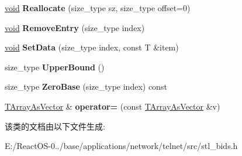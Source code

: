 \begin{DoxyCompactItemize}
\hyperlink{interfacevoid}{void} {\bfseries Reallocate} (size\+\_\+type sz, size\+\_\+type offset=0)
\item 
\mbox{\label{class_t_array_as_vector_a41928fa71e13bfa14294932bda8471d8}} 
\hyperlink{interfacevoid}{void} {\bfseries Remove\+Entry} (size\+\_\+type index)
\item 
\mbox{\label{class_t_array_as_vector_a2a4c7bbf9299fe089100102fd29f8619}} 
\hyperlink{interfacevoid}{void} {\bfseries Set\+Data} (size\+\_\+type index, const T \&item)
\item 
\mbox{\label{class_t_array_as_vector_a674d679c47a3afa2273c3a669704788e}} 
size\+\_\+type {\bfseries Upper\+Bound} ()
\item 
\mbox{\label{class_t_array_as_vector_ab46c356c10cc95a8ad73d34c2386dabd}} 
size\+\_\+type {\bfseries Zero\+Base} (size\+\_\+type index) const
\item 
\mbox{\label{class_t_array_as_vector_ac87acc821524f7b158ce6433918ac244}} 
\hyperlink{class_t_array_as_vector}{T\+Array\+As\+Vector} \& {\bfseries operator=} (const \hyperlink{class_t_array_as_vector}{T\+Array\+As\+Vector} \&v)
\end{DoxyCompactItemize}


该类的文档由以下文件生成\+:\begin{DoxyCompactItemize}
\item 
E\+:/\+React\+O\+S-\/0../base/applications/network/telnet/src/stl\+\_\+bids.\+h\end{DoxyCompactItemize}
